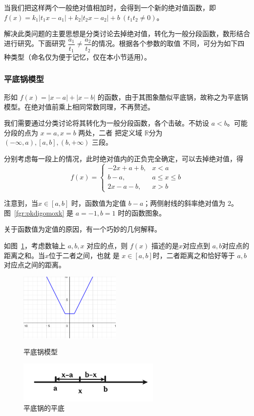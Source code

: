 \documentclass[a4paper,openany]{ctexbook}
\begin{document}
当我们把这样两个一般绝对值相加时，会得到一个新的绝对值函数，即 \(f(x)=k_1|t_1x-a_1|+k_2|t_2x-a_2|+b\ (t_1t_2\ne 0)\)。

解决此类问题的主要思想是分类讨论去掉绝对值，转化为一般分段函数，数形结合进行研究。下面研究 \(\dfrac{a_1}{t_1}\ne \dfrac{a_2}{t_2}\)的情况。根据各个参数的取值
不同，可分为如下四种类型（命名仅为便于记忆，仅在本小节适用）。

\subsubsection{平底锅模型}

形如 \(f(x)=|x-a|+|x-b|\) 的函数，由于其图象酷似平底锅，故称之为平底锅模型。在绝对值前乘上相同常数同理，不再赘述。

我们需要通过分类讨论将其转化为一般分段函数，各个击破。不妨设 \(a<b\)。可能分段的点为 \(x=a,x=b\) 两处，二者
把定义域 \(\mathbb{R} \)分为 \((-\infty ,a),[a,b],(b,+\infty )\) 三段。

分别考虑每一段上的情况，此时绝对值内的正负完全确定，可以去掉绝对值，得
\[
    f(x)=
    \begin{cases}
        -2x+a+b, & x<a          \\
        b-a,     & a \le x\le b \\
        2x-a-b,  & x>b
    \end{cases}
\]

注意到，当\(x\in [a,b]\) 时，函数值为定值 \(b-a\)；两侧射线的斜率绝对值为 \(2\)。图~\ref{fgr:pkdigomoxk} 是 \(a=-1,b=1\) 时的函数图象。

关于函数值为定值的原因，有一个巧妙的几何解释。

如图~\ref{fgr:pkdigodepkdi}，考虑数轴上 \(a,b,x\) 对应的点，则 \(f(x)\) 描述的是\(x\)对应点到 \(a,b\)对应点的距离之和。当\(x\)位于二者之间，也就
是 \(x\in [a,b]\)时，二者距离之和恰好等于 \(a,b\) 对应点之间的距离。

\begin{figure}
    \centering
    \begin{minipage}{5cm}
        \centering
        \includegraphics[width=5cm]{image14.png}
        \caption{平底锅模型}\label{fgr:pkdigomoxk}
    \end{minipage}
    \hfill
    \begin{minipage}{7cm}
        \centering
        \includegraphics[width=7cm]{image15.png}
        \caption{平底锅的平底}\label{fgr:pkdigodepkdi}
    \end{minipage}
\end{figure}
\end{document}
